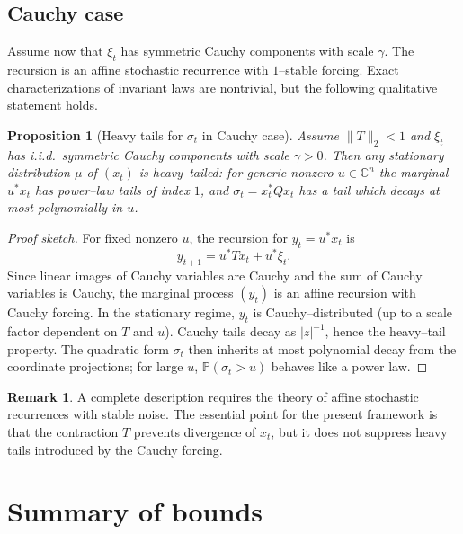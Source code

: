 \documentclass[11pt]{article}
\theoremstyle{plain}
\newtheorem{proposition}[theorem]{Proposition}
\theoremstyle{definition}
\newtheorem{remark}[theorem]{Remark}
\numberwithin{equation}{section}
\begin{document}
\subsection{Cauchy case}

Assume now that $\xi_t$ has symmetric Cauchy components with
scale $\gamma$. The recursion is an affine stochastic recurrence with
$1$--stable forcing. Exact characterizations of invariant laws are
nontrivial, but the following qualitative statement holds.

\begin{proposition}[Heavy tails for $\sigma_t$ in Cauchy case]
\label{prop:cauchy-tails}
Assume $\|T\|_2 < 1$ and $\xi_t$ has i.i.d.\ symmetric Cauchy
components with scale $\gamma>0$. Then any stationary distribution
$\mu$ of $(x_t)$ is heavy--tailed: for generic nonzero $u \in \mathbb{C}^n$
the marginal $u^\ast x_t$ has power--law tails of index $1$, and
$\sigma_t = x_t^\ast Q x_t$ has a tail which decays at most
polynomially in $u$.
\end{proposition}

\begin{proof}[Proof sketch]
For fixed nonzero $u$, the recursion for $y_t = u^\ast x_t$ is
\begin{equation*}
  y_{t+1} = u^\ast T x_t + u^\ast \xi_t.
\end{equation*}
Since linear images of Cauchy variables are Cauchy and the sum of
Cauchy variables is Cauchy, the marginal process $(y_t)$ is an affine
recursion with Cauchy forcing. In the stationary regime, $y_t$ is
Cauchy--distributed (up to a scale factor dependent on $T$ and $u$).
Cauchy tails decay as $|z|^{-1}$, hence the heavy--tail property.
The quadratic form $\sigma_t$ then inherits at most polynomial decay
from the coordinate projections; for large $u$,
$\mathbb{P}(\sigma_t > u)$ behaves like a power law.
\end{proof}

\begin{remark}
A complete description requires the theory of affine stochastic
recurrences with stable noise. The essential point for the present
framework is that the contraction $T$ prevents divergence of $x_t$,
but it does not suppress heavy tails introduced by the Cauchy forcing.
\end{remark}

\section{Summary of bounds}
\end{document}
